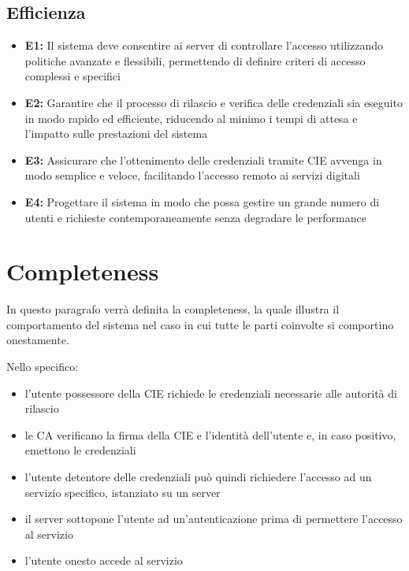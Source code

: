         \subsection{Efficienza}
            \begin{itemize}
                \item \textbf{E1:} Il sistema deve consentire ai server di controllare l'accesso utilizzando politiche avanzate e flessibili, permettendo di definire criteri di accesso complessi e specifici
                
                \item \textbf{E2:} Garantire che il processo di rilascio e verifica delle credenziali sia eseguito in modo rapido ed efficiente, riducendo al minimo i tempi di attesa e l'impatto sulle prestazioni del sistema
                
                \item \textbf{E3:} Assicurare che l'ottenimento delle credenziali tramite CIE avvenga in modo semplice e veloce, facilitando l'accesso remoto ai servizi digitali
    
                \item \textbf{E4:} Progettare il sistema in modo che possa gestire un grande numero di utenti e richieste contemporaneamente senza degradare le performance
            \end{itemize}
    
    
    \section{Completeness}
        In questo paragrafo verrà definita la completeness, la quale illustra il comportamento del sistema nel caso in cui tutte le parti coinvolte si comportino onestamente.
        
        \noindent Nello specifico:

        \begin{itemize}
            \item l'utente possessore della CIE richiede le credenziali necessarie alle autorità di rilascio

            \item le CA verificano la firma della CIE e l'identità dell'utente e, in caso positivo, emettono le credenziali 

            \item l'utente detentore delle credenziali può quindi richiedere l'accesso ad un servizio specifico, istanziato su un server

            \item il server sottopone l'utente ad un'autenticazione prima di permettere l'accesso al servizio

            \item l'utente onesto accede al servizio
        \end{itemize}